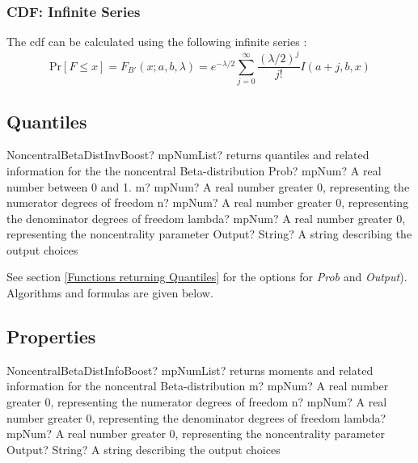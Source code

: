 \subsubsection{CDF: Infinite Series}
The cdf can be calculated using the following infinite series \cite{Benton_2003}:
\begin{equation}
	\text{Pr}[F \leq x] = F_{B'}(x;a,b,\lambda) = e^{-\lambda/2} \sum_{j=0}^{\infty}{\frac{(\lambda/2)^j}{j!}I(a+j,b,x)}
\end{equation}



\subsection{Quantiles}

\begin{mpFunctionsExtract}
	\mpFunctionFive
	{NoncentralBetaDistInvBoost? mpNumList? returns quantiles and related information for the the noncentral Beta-distribution}
	{Prob? mpNum? A real number between 0 and 1.}
	{m? mpNum? A real number greater 0, representing the numerator  degrees of freedom}
	{n? mpNum? A real number greater 0, representing the denominator degrees of freedom}
	{lambda? mpNum? A real number greater 0, representing the noncentrality parameter}
	{Output? String? A string describing the output choices}
\end{mpFunctionsExtract}

See section \ref{Functions returning Quantiles} for the options for  {\itshape\sffamily Prob} and {\itshape\sffamily Output}). Algorithms and formulas are given below.




\subsection{Properties}
\label{NoncentralBetaDistributionProperties}


\begin{mpFunctionsExtract}
	\mpFunctionFour
	{NoncentralBetaDistInfoBoost? mpNumList? returns moments and related information for the noncentral Beta-distribution}
	{m? mpNum? A real number greater 0, representing the numerator  degrees of freedom}
	{n? mpNum? A real number greater 0, representing the denominator degrees of freedom}
	{lambda? mpNum? A real number greater 0, representing the noncentrality parameter}
	{Output? String? A string describing the output choices}
\end{mpFunctionsExtract}

